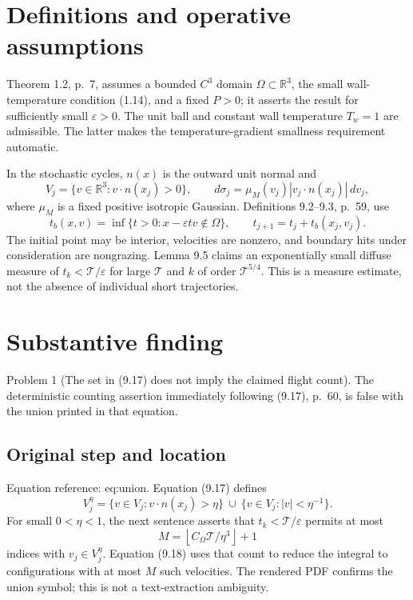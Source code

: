 \documentclass[10pt]{article}
\begin{document}
\section*{Definitions and operative assumptions}
Theorem 1.2, p. 7, assumes a bounded \(C^3\) domain \(\Omega\subset\mathbb R^3\), the small wall-temperature condition (1.14), and a fixed \(P>0\); it asserts the result for sufficiently small \(\varepsilon>0\). The unit ball and constant wall temperature \(T_w=1\) are admissible. The latter makes the temperature-gradient smallness requirement automatic.\par
In the stochastic cycles, \(n(x)\) is the outward unit normal and \[V_j=\{v\in\mathbb R^3:v\cdot n(x_j)>0\},\qquad
 d\sigma_j=\mu_M(v_j)|v_j\cdot n(x_j)|\,dv_j,\] where \(\mu_M\) is a fixed positive isotropic Gaussian. Definitions 9.2–9.3, p. 59, use \[t_b(x,v)=\inf\{t>0:x-\varepsilon tv\notin\Omega\},
 \qquad t_{j+1}=t_j+t_b(x_j,v_j).\] The initial point may be interior, velocities are nonzero, and boundary hits under consideration are nongrazing. Lemma 9.5 claims an exponentially small diffuse measure of \(t_k<\mathcal T/\varepsilon\) for large \(\mathcal T\) and \(k\) of order \(\mathcal T^{5/4}\). This is a measure estimate, not the absence of individual short trajectories.\par
\section*{Substantive finding}
Problem 1 (The set in (9.17) does not imply the claimed flight count).  The deterministic counting assertion immediately following (9.17), p. 60, is false with the union printed in that equation.\par
\subsection*{Original step and location}
Equation reference: eq:union. Equation (9.17) defines \[
 V_j^\eta
 =\{v\in V_j:v\cdot n(x_j)>\eta\}
 \ \cup\ \{v\in V_j:|v|<\eta^{-1}\}.\] For small \(0<\eta<1\), the next sentence asserts that \(t_k<\mathcal T/\varepsilon\) permits at most \[M=\left\lfloor C_\Omega\mathcal T/\eta^3\right\rfloor+1\] indices with \(v_j\in V_j^\eta\). Equation (9.18) uses that count to reduce the integral to configurations with at most \(M\) such velocities. The rendered PDF confirms the union symbol; this is not a text-extraction ambiguity.\par
\end{document}
